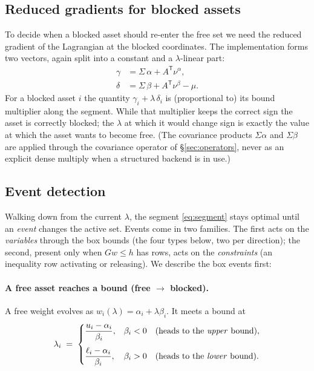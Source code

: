 \documentclass[11pt]{article}
\newcommand{\Sig}{\Sigma}
\newcommand{\lb}{\ell}              %
\newcommand{\ub}{u}                 %
\newcommand{\trans}{^{\mathsf{T}}}
\begin{document}
\subsection{Reduced gradients for blocked assets}

To decide when a blocked asset should re-enter the free set we need the reduced
gradient of the Lagrangian at the blocked coordinates. The implementation forms two
vectors, again split into a constant and a $\lambda$-linear part:
\begin{align}
\gamma &= \Sig\,\alpha + A\trans \nu^{\alpha}, \label{eq:gamma}\\
\delta &= \Sig\,\beta + A\trans \nu^{\beta} - \mu. \label{eq:delta}
\end{align}
For a blocked asset $i$ the quantity $\gamma_i + \lambda\,\delta_i$ is (proportional to)
its bound multiplier along the segment. While that multiplier keeps the correct sign
the asset is correctly blocked; the $\lambda$ at which it would change sign is exactly
the value at which the asset wants to become free. (The covariance products
$\Sig\alpha$ and $\Sig\beta$ are applied through the covariance operator of
\S\ref{sec:operators}, never as an explicit dense multiply when a structured backend is
in use.)

\subsection{Event detection}
\label{sec:events}

Walking down from the current $\lambda$, the segment \eqref{eq:segment} stays optimal
until an \emph{event} changes the active set. Events come in two families. The first
acts on the \emph{variables} through the box bounds (the four types below, two per
direction); the second, present only when $G w \le h$ has rows, acts on the
\emph{constraints} (an inequality row activating or releasing). We describe the box
events first:

\paragraph{A free asset reaches a bound (free $\to$ blocked).}
A free weight evolves as $w_i(\lambda) = \alpha_i + \lambda\beta_i$. It meets a bound at
\begin{equation}
\label{eq:freeevents}
\lambda_i \;=\;
\begin{cases}
\dfrac{\ub_i - \alpha_i}{\beta_i}, & \beta_i < 0 \quad\text{(heads to the \emph{upper} bound)},\\[1.2em]
\dfrac{\lb_i - \alpha_i}{\beta_i}, & \beta_i > 0 \quad\text{(heads to the \emph{lower} bound)}.
\end{cases}
\end{equation}
\end{document}
